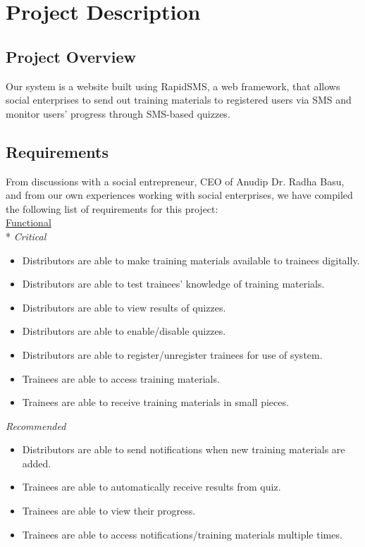 \chapter{Project Description}

\section{Project Overview}
Our system is a website built using RapidSMS, a web framework, that allows social enterprises to send out training materials to registered users via SMS and monitor users’ progress through SMS-based quizzes.

\section{Requirements}
From discussions with a social entrepreneur, CEO of Anudip Dr. Radha Basu, and from our own experiences working with social enterprises, we have compiled the following list of requirements for this project: \\

\underline{Functional}\\*
\textit{Critical}
\begin{itemize}
\item Distributors are able to make training materials available to trainees digitally.
\item Distributors are able to test trainees’ knowledge of training materials.
\item Distributors are able to view results of quizzes.
\item Distributors are able to enable/disable quizzes.
\item Distributors are able to register/unregister trainees for use of system.
\item Trainees are able to access training materials.
\item Trainees are able to receive training materials in small pieces.
\end{itemize}

\textit{Recommended}
\begin{itemize}
\item Distributors are able to send notifications when new training materials are added.
\item Trainees are able to automatically receive results from quiz.
\item Trainees are able to view their progress.
\item Trainees are able to access notifications/training materials multiple times.
\end{itemize}

